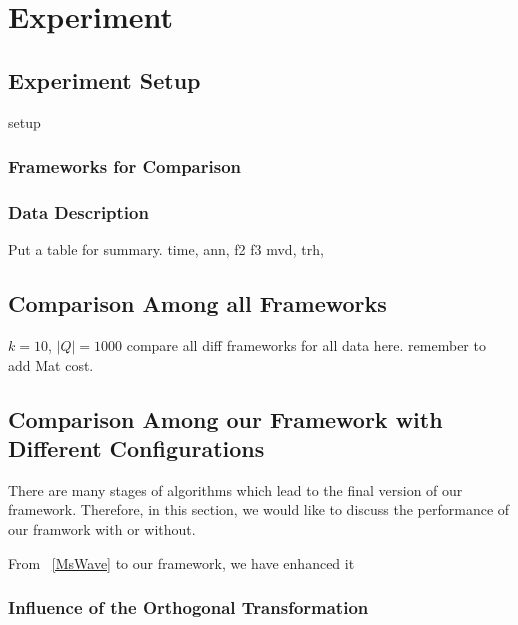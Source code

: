 \chapter{Experiment}
\label{c:exp}

\section{Experiment Setup} %
\label{s:experiment_setup}
setup~

\subsection{Frameworks for Comparison} %
\label{sub:frameworks_for_comparison}


\subsection{Data Description} %
\label{ss:data_description}
Put a table for summary.
time,
ann,
f2
f3
mvd,
trh,

\section{Comparison Among all Frameworks} %
\label{s:comparison_among_all_frameworks}

$k=10$, $|Q|=1000$
compare all diff frameworks for all data here. remember to add Mat cost.


\section{Comparison Among our Framework with Different Configurations} %
\label{s:comparison_among_our_framework_with_different_configurations}

There are many stages of algorithms which lead to the final version of our framework.  Therefore, in this section, we would like to discuss the performance of our framwork with or without.

From ~\ref{MsWave} to our framework, we have enhanced it


\subsection{Influence of the Orthogonal Transformation} %
\label{ss:influence_of_the_orthogonal_transformation}

